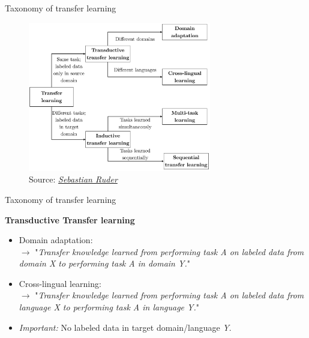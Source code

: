 \documentclass[]{beamer}
\begin{document}
\begin{frame}{Taxonomy of transfer learning \href{https://ruder.io/thesis/}{}}
	\begin{figure}
		\centering
		\includegraphics[width = 8cm]{figure/transfer_learning_taxonomy-1.png}\\ 
		\footnotesize{Source:} \href{https://ruder.io/thesis/}{\footnotesize \it Sebastian Ruder}
	\end{figure}
\end{frame}



\begin{frame}{Taxonomy of transfer learning \href{https://ruder.io/thesis/}{}}

	\textbf{Transductive Transfer learning}

	\begin{itemize}
		\item Domain adaptation:\\
					$\rightarrow$ "\textit{Transfer knowledge learned from performing task A on labeled data from domain X to performing task A in domain Y.}"\\\mbox{}
		\item Cross-lingual learning:\\
					$\rightarrow$ "\textit{Transfer knowledge learned from performing task A on labeled data from language X to performing task A in language Y.}"\\\mbox{}
		\item \textit{Important:} No labeled data in target domain/language \textit{Y}.
	\end{itemize}
\end{frame}
\end{document}
